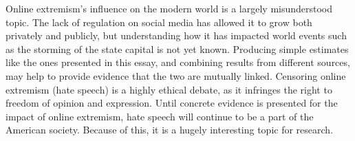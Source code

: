 \documentclass[10pt,a4paper,notitlepage]{article}
\begin{document}
Online extremism's influence on the modern world is a largely misunderstood topic. The lack of regulation on social media has allowed it to grow both privately and publicly, but understanding how it has impacted world events such as the storming of the state capital is not yet known. Producing simple estimates like the ones presented in this essay, and combining results from different sources, may help to provide evidence that the two are mutually linked. Censoring online extremism (hate speech) is a highly ethical debate, as it infringes the right to freedom of opinion and expression. Until concrete evidence is presented for the impact of online extremism, hate speech will continue to be a part of the American society. Because of this, it is a hugely interesting topic for research.

\printbibliography
\end{document}
